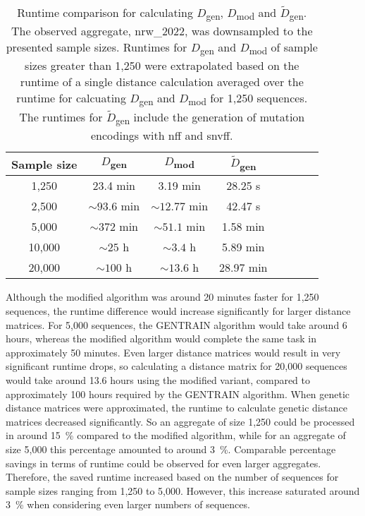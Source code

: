 \begin{table}[H]
    \caption[Runtime comparison for calculating $D$\textsubscript{gen}, $D$\textsubscript{mod} and $\tilde{D}$\textsubscript{gen}]{Runtime comparison for calculating $D$\textsubscript{gen}, $D$\textsubscript{mod} and $\tilde{D}$\textsubscript{gen}. The observed aggregate, nrw\_2022, was downsampled to the presented sample sizes. Runtimes for $D$\textsubscript{gen} and $D$\textsubscript{mod} of sample sizes greater than 1,250 were extrapolated based on the runtime of a single distance calculation averaged over the runtime for calcuating $D$\textsubscript{gen} and $D$\textsubscript{mod} for 1,250 sequences. The runtimes for $\tilde{D}$\textsubscript{gen} include the generation of mutation encodings with \acrshort{nff} and \acrshort{snvff}.} 
    \centering
    \begin{tabular}{  Sc || Sc Sc Sc } 
    Sample size & $D$\textsubscript{gen} & $D$\textsubscript{mod} & $\tilde{D}$\textsubscript{gen} \\
    ,250 & 23.4 min & 3.19 min & 28.25 s\\
    2,500 &$\sim 93.6$ min&$\sim 12.77$ min & 42.47 s\\
    5,000 &$\sim372$ min&$\sim 51.1$ min & 1.58 min\\
    10,000 &$\sim 25$ h&$\sim 3.4$ h & 5.89 min\\
    20,000 &$\sim 100$ h&$\sim 13.6$ h & 28.97 min\\
    \end{tabular} 
    \label{table:algorithm_and_approximation_runtime_comparison}
\end{table}

Although the modified algorithm was around 20 minutes faster for 1,250 sequences, the runtime difference would increase significantly for larger distance matrices. For 5,000 sequences, the GENTRAIN algorithm would take around 6 hours, whereas the modified algorithm would complete the same task in approximately 50 minutes. Even larger distance matrices would result in very significant runtime drops, so calculating a distance matrix for 20,000 sequences would take around 13.6 hours using the modified variant, compared to approximately 100 hours required by the GENTRAIN algorithm. When genetic distance matrices were approximated, the runtime to calculate genetic distance matrices decreased significantly. So an aggregate of size 1,250 could be processed in around 15~\% compared to the modified algorithm, while for an aggregate of size 5,000 this percentage amounted to around 3~\%. Comparable percentage savings in terms of runtime could be observed for even larger aggregates. Therefore, the saved runtime increased based on the number of sequences for sample sizes ranging from 1,250 to 5,000. However, this increase saturated around 3~\% when considering even larger numbers of sequences.

